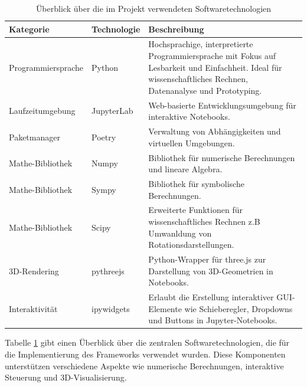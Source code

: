 \vspace{1em}
    \begin{table}[H]
        \centering
        \begin{tabular}{|p{3.5cm}|p{2cm}|p{8cm}|}
        \hline
        Kategorie                   & Technologie                   & Beschreibung  \\ \hline
        Programmiersprache          & Python                        & Hochsprachige, interpretierte Programmiersprache mit Fokus auf Lesbarkeit und Einfachheit. Ideal für wissenschaftliches Rechnen, Datenanalyse und Prototyping.        \\ \hline
        Laufzeitumgebung            & JupyterLab                    & Web-basierte Entwicklungsumgebung für interaktive Notebooks.        \\ \hline
        Paketmanager                & Poetry                        & Verwaltung von Abhängigkeiten und virtuellen Umgebungen.        \\ \hline
        Mathe-Bibliothek            & Numpy                         & Bibliothek für numerische Berechnungen und lineare Algebra.        \\ \hline
        Mathe-Bibliothek            & Sympy                         & Bibliothek für symbolische Berechnungen.        \\ \hline
        Mathe-Bibliothek            & Scipy                         & Erweiterte Funktionen für wissenschaftliches Rechnen z.B Umwanldung von Rotationsdarstellungen.        \\ \hline
        3D-Rendering                & pythreejs                     & Python-Wrapper für three.js zur Darstellung von 3D-Geometrien in Notebooks.        \\ \hline
        Interaktivität              & ipywidgets                    & Erlaubt die Erstellung interaktiver GUI-Elemente wie Schieberegler, Dropdowns und Buttons in Jupyter-Notebooks.        \\ \hline
        \end{tabular}
        \caption{Überblick über die im Projekt verwendeten Softwaretechnologien}
        \label{tab:technologien}
    \end{table}
\vspace{1em}


Tabelle \ref{tab:technologien} gibt einen Überblick über die zentralen Softwaretechnologien,
die für die Implementierung des Frameworks verwendet wurden. Diese Komponenten unterstützen verschiedene Aspekte wie numerische Berechnungen,
interaktive Steuerung und 3D-Visualisierung.


